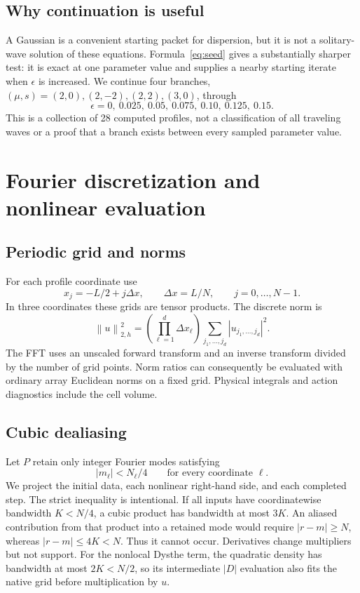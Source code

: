 \documentclass[10pt,letterpaper]{article}
\numberwithin{equation}{section}
\newcommand{\norm}[1]{\left\|#1\right\|}
\begin{document}
\subsection{Why continuation is useful}
A Gaussian is a convenient starting packet for dispersion, but it is not a solitary-wave solution of these equations. Formula~\eqref{eq:seed} gives a substantially sharper test: it is exact at one parameter value and supplies a nearby starting iterate when $\epsilon$ is increased. We continue four branches, $(\mu,s)=(2,0),(2,-2),(2,2),(3,0)$, through
\begin{equation}
 \epsilon=0,\ 0.025,\ 0.05,\ 0.075,\ 0.10,\ 0.125,\ 0.15.
\end{equation}
This is a collection of 28 computed profiles, not a classification of all traveling waves or a proof that a branch exists between every sampled parameter value.

\section{Fourier discretization and nonlinear evaluation}
\subsection{Periodic grid and norms}
For each profile coordinate use
\begin{equation}
 x_j=-L/2+j\Delta x,\qquad \Delta x=L/N,\qquad j=0,\ldots,N-1.
\end{equation}
In three coordinates these grids are tensor products. The discrete norm is
\begin{equation}
 \norm{u}_{2,h}^2=\left(\prod_{\ell=1}^d\Delta x_\ell\right)
                  \sum_{j_1,\ldots,j_d}|u_{j_1,\ldots,j_d}|^2.
\end{equation}
The FFT uses an unscaled forward transform and an inverse transform divided by the number of grid points. Norm ratios can consequently be evaluated with ordinary array Euclidean norms on a fixed grid. Physical integrals and action diagnostics include the cell volume.

\subsection{Cubic dealiasing}
Let $P$ retain only integer Fourier modes satisfying
\begin{equation}\label{eq:cutoff}
 |m_\ell|<N_\ell/4\qquad\text{for every coordinate }\ell.
\end{equation}
We project the initial data, each nonlinear right-hand side, and each completed step. The strict inequality is intentional. If all inputs have coordinatewise bandwidth $K<N/4$, a cubic product has bandwidth at most $3K$. An aliased contribution from that product into a retained mode would require $|r-m|\geq N$, whereas $|r-m|\leq4K<N$. Thus it cannot occur. Derivatives change multipliers but not support. For the nonlocal Dysthe term, the quadratic density has bandwidth at most $2K<N/2$, so its intermediate $|D|$ evaluation also fits the native grid before multiplication by $u$.
\end{document}
